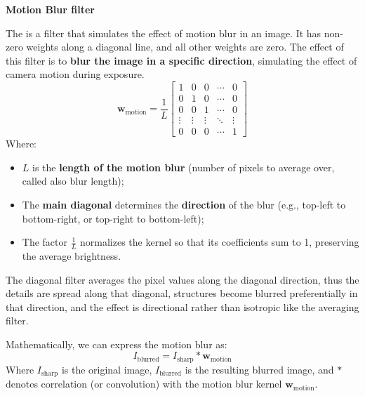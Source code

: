 \highspace
\begin{flushleft}
    \textcolor{Green3}{ \textbf{Motion Blur filter}}
\end{flushleft}
The  is a filter that simulates the effect of motion blur in an image. It has non-zero weights along a diagonal line, and all other weights are zero. The effect of this filter is to \textbf{blur the image in a specific direction}, simulating the effect of camera motion during exposure.
\begin{equation}
    \mathbf{w}_{\text{motion}} = \frac{1}{L} \begin{bmatrix}
        1 & 0 & 0 & \cdots & 0 \\
        0 & 1 & 0 & \cdots & 0 \\
        0 & 0 & 1 & \cdots & 0 \\
        \vdots & \vdots & \vdots & \ddots & \vdots \\
        0 & 0 & 0 & \cdots & 1
    \end{bmatrix}
\end{equation}
Where:
\begin{itemize}
    \item $L$ is the \textbf{length of the motion blur} (number of pixels to average over, called also blur length);
    \item The \textbf{main diagonal} determines the \textbf{direction} of the blur (e.g., top-left to bottom-right, or top-right to bottom-left);
    \item The factor $\frac{1}{L}$ normalizes the kernel so that its coefficients sum to 1, preserving the average brightness.
\end{itemize}
The diagonal filter averages the pixel values along the diagonal direction, thus the details are spread along that diagonal, structures become blurred preferentially in that direction, and the effect is directional rather than isotropic like the averaging filter.

\highspace
Mathematically, we can express the motion blur as:
\begin{equation*}
    I_\text{blurred} = I_{\text{sharp}} * \mathbf{w}_{\text{motion}}
\end{equation*}
Where $I_{\text{sharp}}$ is the original image, $I_\text{blurred}$ is the resulting blurred image, and $*$ denotes correlation (or convolution) with the motion blur kernel $\mathbf{w}_{\text{motion}}$.

